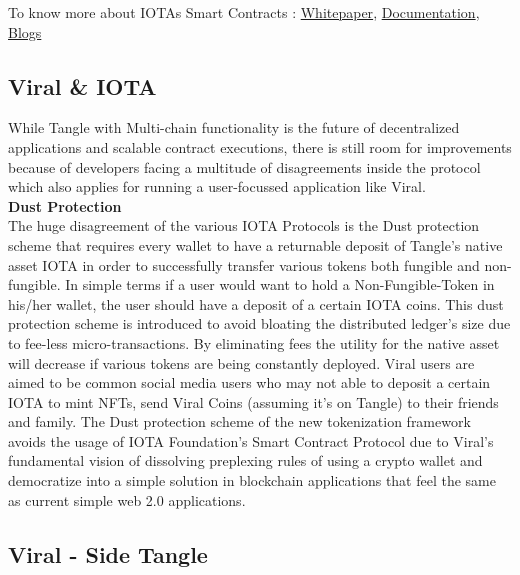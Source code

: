 \documentclass[10pt]{article}
\begin{document}
To know more about IOTA\textsc{}s Smart Contracts : \hyperlink{https://files.iota.org/papers/ISC_WP_Nov_10_2021.pdf}{Whitepaper}, \hyperlink{https://wiki.iota.org/smart-contracts/overview}{Documentation}, \hyperlink{https://blog.iota.org/iota-smart-contracts-beta-release/}{Blogs}\\

\subsection{Viral \& IOTA}

While Tangle with Multi-chain functionality is the future of decentralized applications and scalable contract executions, there is still room for improvements because of developers facing a multitude of disagreements inside the protocol which also applies for running a user-focussed application like Viral. \\

\textbf{Dust Protection}\\

The huge disagreement of the various IOTA Protocols is the Dust protection scheme that requires every wallet to have a returnable deposit of Tangle's native asset IOTA in order to successfully transfer various tokens both fungible and non-fungible. In simple terms if a user would want to hold a Non-Fungible-Token in his/her wallet, the user should have a deposit of a certain IOTA coins. This dust protection scheme is introduced to avoid bloating the distributed ledger's size due to fee-less micro-transactions. By eliminating fees the utility for the native asset will decrease if various tokens are being constantly deployed. Viral users are aimed to be common social media users who may not able to deposit a certain IOTA to mint NFTs, send Viral Coins (assuming it's on Tangle) to their friends and family. The Dust protection scheme of the new tokenization framework avoids the usage of IOTA Foundation's Smart Contract Protocol due to Viral's fundamental vision of dissolving preplexing rules of using a crypto wallet and democratize into a simple solution in blockchain applications that feel the same as current simple web 2.0 applications.

\subsection{Viral - Side Tangle}
\end{document}
